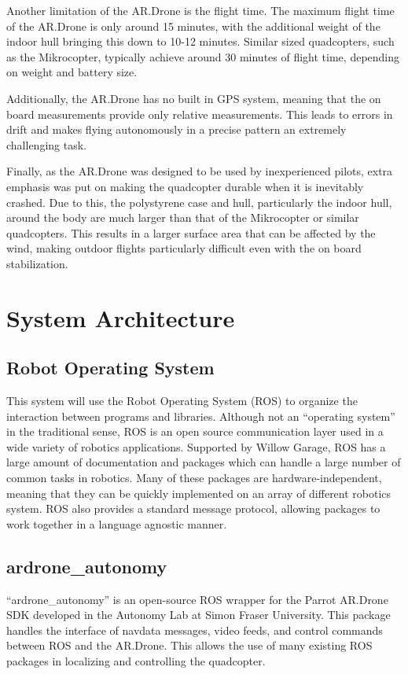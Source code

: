 Another limitation of the AR.Drone is the flight time. The maximum flight time of the AR.Drone is only around 15 minutes, with the additional weight of the indoor hull bringing this down to 10-12 minutes. Similar sized quadcopters, such as the Mikrocopter, typically achieve around 30 minutes of flight time, depending on weight and battery size.\cite{Mikrocopter}

Additionally, the AR.Drone has no built in GPS system, meaning that the on board measurements provide only relative measurements. This leads to errors in drift and makes flying autonomously in a precise pattern an extremely challenging task.

Finally, as the AR.Drone was designed to be used by inexperienced pilots, extra emphasis was put on making the quadcopter durable when it is inevitably crashed. Due to this, the polystyrene case and hull, particularly the indoor hull, around the body are much larger than that of the Mikrocopter or similar quadcopters. This results in a larger surface area that can be affected by the wind, making outdoor flights particularly difficult even with the on board stabilization. 

\section{System Architecture}

\subsection{Robot Operating System}
This system will use the Robot Operating System (ROS) to organize the interaction between programs and libraries. Although not an ``operating system'' in the traditional sense, ROS is an open source communication layer used in a wide variety of robotics applications. Supported by Willow Garage, ROS has a large amount of documentation and packages which can handle a large number of common tasks in robotics. Many of these packages are hardware-independent, meaning that they can be quickly implemented on an array of different robotics system. ROS also provides a standard message protocol, allowing packages to work together in a language agnostic manner.\cite{ROS}\cite{Berard}

\subsection{ardrone\_autonomy}
``ardrone\_autonomy'' is an open-source ROS wrapper for the Parrot AR.Drone SDK developed in the Autonomy Lab at Simon Fraser University.\cite{Autonomy} This package handles the interface of navdata messages, video feeds, and control commands between ROS and the AR.Drone. This allows the use of many existing ROS packages in localizing and controlling the quadcopter.

